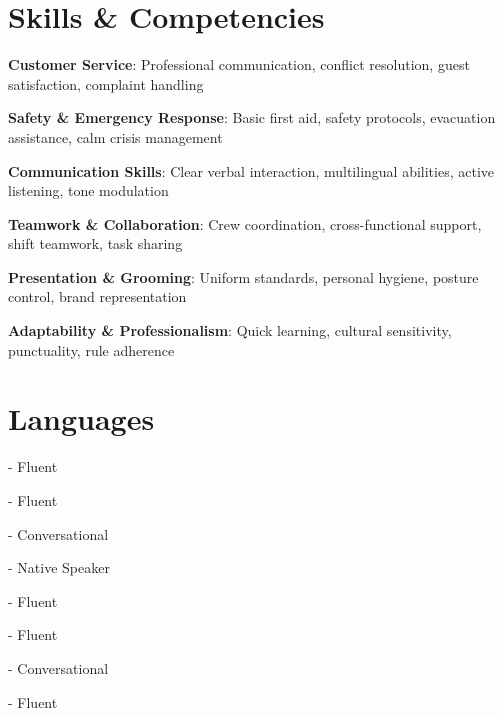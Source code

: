 \documentclass[a4paper,11pt]{article}
\begin{document}
\section{Skills \& Competencies}
\begin{itemize}[leftmargin=0.15in, label={}, itemsep=0pt]
	\small{
		\item \textbf{Customer Service}: Professional communication, conflict resolution, guest satisfaction, complaint handling
		\item \textbf{Safety \& Emergency Response}: Basic first aid, safety protocols, evacuation assistance, calm crisis management
		\item \textbf{Communication Skills}: Clear verbal interaction, multilingual abilities, active listening, tone modulation
		\item \textbf{Teamwork \& Collaboration}: Crew coordination, cross-functional support, shift teamwork, task sharing
		\item \textbf{Presentation \& Grooming}: Uniform standards, personal hygiene, posture control, brand representation
		\item \textbf{Adaptability \& Professionalism}: Quick learning, cultural sensitivity, punctuality, rule adherence
	}
\end{itemize}

\section{Languages}
\begin{itemize}[leftmargin=0.15in, label={}, itemsep=1pt]
    \small{
        \item {} - Fluent
        \item {} - Fluent
        \item {} - Conversational
        \item {} - Native Speaker
        \item {} - Fluent
        \item {} - Fluent
        \item {} - Conversational
        \item {} - Fluent
    }
\end{itemize}
\end{document}
